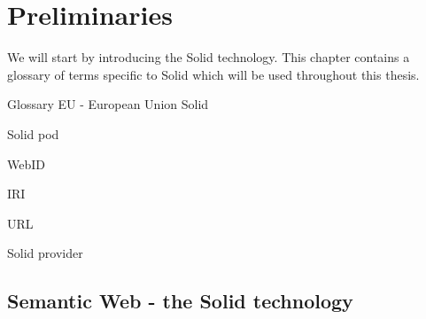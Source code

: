 \chapter{Preliminaries}
We will start by introducing the Solid technology.
This chapter contains a glossary of terms specific to Solid which will be used throughout this thesis.

Glossary
EU - European Union
Solid

Solid pod

WebID

IRI

URL

Solid provider

\section{Semantic Web - the Solid technology}
